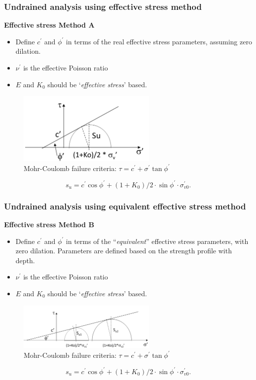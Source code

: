 \documentclass[notes]{beamer}
\begin{document}
\begin{frame}
\frametitle{Undrained analysis using effective stress method}
\textbf{Effective stress Method A}
\begin{itemize}
	\item Define $c^\prime$ and $\phi^\prime$ in terms of the real effective stress parameters, assuming zero dilation.
	\item $\nu^\prime$ is the effective Poisson ratio
	\item $E$ and $K_0$ should be `\textit{effective stress}' based.
\end{itemize}
\begin{figure}
	\includegraphics[width=0.6\textwidth]{figs/su-effective.png}
	\caption*{Mohr-Coulomb failure criteria: $\tau = c^\prime + \sigma^\prime \tan \phi^\prime$}
\end{figure}
	\begin{equation*}
		s_u = c^\prime \cos \phi^\prime + (1+K_0)/2 \cdot \sin \phi^\prime \cdot \sigma_{v0}^\prime.
	\end{equation*}
\end{frame}

\begin{frame}
\frametitle{Undrained analysis using equivalent effective stress method}
\textbf{Effective stress Method B}
\begin{itemize}
	\item Define $c^\prime$ and $\phi^\prime$ in terms of the ``\textit{equivalent}'' effective stress parameters, with zero dilation. Parameters are defined based on the strength profile with depth.
	\item $\nu^\prime$ is the effective Poisson ratio
	\item $E$ and $K_0$ should be `\textit{effective stress}' based.
\end{itemize}
\begin{figure}
	\includegraphics[width=0.6\textwidth]{figs/su-total.png}
	\caption*{Mohr-Coulomb failure criteria: $\tau = c^\prime + \sigma^\prime \tan \phi^\prime$}
\end{figure}
\begin{equation*}
s_u = c^\prime \cos \phi^\prime + (1+K_0)/2 \cdot \sin \phi^\prime \cdot \sigma_{v0}^\prime.
\end{equation*}
\end{frame}
\end{document}
